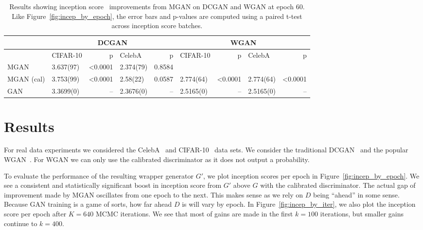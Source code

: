 \documentclass{article}
\begin{document}
\begin{table}[htbp]
\centering
    \caption{{\small
    Results showing inception score~\citep{Salimans2016} improvements from MGAN on DCGAN and WGAN at epoch 60.
    Like Figure~\ref{fig:incep_by_epoch}, the error bars and p-values are computed using a paired t-test across inception score batches.
    }}
    \label{tbl:inception}
{\scriptsize
\begin{tabular}{|l|l|r|l|r||l|r|l|r|}
\toprule
~                 & \multicolumn{4}{c}{DCGAN}                               & \multicolumn{4}{c}{WGAN} \\
\toprule
~                 & CIFAR-10         &      p   & CelebA         &      p   & CIFAR-10        &       p   & CelebA        &       p  \\
\midrule
MGAN              &        3.637(97) &  <0.0001 &      2.374(79) &  0.8584  &              ~  &        ~  &            ~  &      ~   \\
MGAN (cal)        &        3.753(99) &  <0.0001 &      2.58(22)  &  0.0587  &       2.774(64)  &  <0.0001 &     2.774(64) &  <0.0001 \\
GAN               &        3.3699(0) &       -- &      2.3676(0) &      --  &       2.5165(0) &        -- &     2.5165(0) &       -- \\
\bottomrule
\end{tabular}
}
\end{table}


\section{Results}
\label{sec:Results}

For real data experiments we considered the CelebA~\citep{Liu2015} and CIFAR-10~\citep{Torralba2008} data sets.
We consider the traditional DCGAN~\citep{Radford2015} and the popular WGAN~\citep{Arjovsky2017}\@.
For WGAN we can only use the calibrated discriminator as it does not output a probability.

To evaluate the performance of the resulting wrapper generator $G'$, we plot inception scores per epoch in Figure~\ref{fig:incep_by_epoch}.
We see a consistent and statistically significant boost in inception score from $G'$ above $G$ with the calibrated discriminator.
The actual gap of improvement made by MGAN oscillates from one epoch to the next.
This makes sense as we rely on $D$ being ``ahead'' in some sense.
Because GAN training is a game of sorts, how far ahead $D$ is will vary by epoch.
In Figure~\ref{fig:incep_by_iter}, we also plot the inception score per epoch after $K=640$ MCMC iterations.
We see that most of gains are made in the first $k=100$ iterations, but smaller gains continue to $k=400$.
\end{document}
